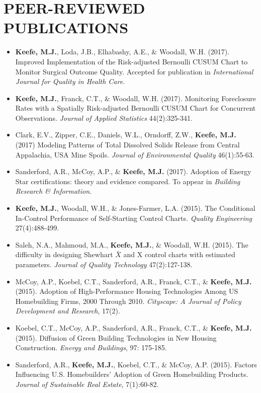 \documentclass[10pt]{article}
\begin{document}
\section*{PEER-REVIEWED PUBLICATIONS}
\begin{itemize}

\item[] \textbf{Keefe, M.J.}, Loda, J.B., Elhabashy, A.E., \& Woodall, W.H. (2017). Improved Implementation of the Risk-adjusted Bernoulli CUSUM Chart to Monitor Surgical Outcome Quality. Accepted for publication in \textit{International Journal for Quality in Health Care}.

\item[] \textbf{Keefe, M.J.}, Franck, C.T., \& Woodall, W.H. (2017). Monitoring Foreclosure Rates with a Spatially Risk-adjusted Bernoulli CUSUM Chart for Concurrent Observations. \textit{Journal of Applied Statistics} 44(2):325-341.

\item[] Clark, E.V., Zipper, C.E., Daniels, W.L., Orndorff, Z.W., \textbf{Keefe, M.J.} (2017) Modeling Patterns of Total Dissolved Solids Release from Central Appalachia, USA Mine Spoils. \textit{Journal of Environmental Quality} 46(1):55-63.

\item[] Sanderford, A.R., McCoy, A.P., \& \textbf{Keefe, M.J.} (2017). Adoption of Energy Star certifications: theory and evidence compared. To appear in \textit{Building Research \& Information}.

\item[] \textbf{Keefe, M.J.}, Woodall, W.H., \& Jones-Farmer, L.A. (2015). The Conditional In-Control Performance of Self-Starting Control Charts. \textit{Quality Engineering} 27(4):488-499.

\item[] Saleh, N.A., Mahmoud, M.A., \textbf{Keefe, M.J.}, \& Woodall, W.H. (2015). The difficulty in designing Shewhart $\bar{X}$ and X control charts with estimated parameters. \textit{Journal of Quality Technology} 47(2):127-138.

\item[] McCoy, A.P., Koebel, C.T., Sanderford, A.R., Franck, C.T., \& \textbf{Keefe, M.J.} (2015). Adoption of High-Performance Housing Technologies Among US Homebuilding Firms, 2000 Through 2010. \textit{Cityscape: A Journal of Policy Development and Research}, 17(2).

\item[] Koebel, C.T., McCoy, A.P., Sanderford, A.R., Franck, C.T., \& \textbf{Keefe, M.J.} (2015). Diffusion of Green Building Technologies in New Housing Construction. \textit{Energy and Buildings}, 97: 175-185.

\item[] Sanderford, A.R., \textbf{Keefe, M.J.}, Koebel, C.T., \& McCoy, A.P. (2015). Factors Influencing U.S. Homebuilders' Adoption of Green Homebuilding Products. \textit{Journal of Sustainable Real Estate}, 7(1):60-82.

\end{itemize}
\end{document}
